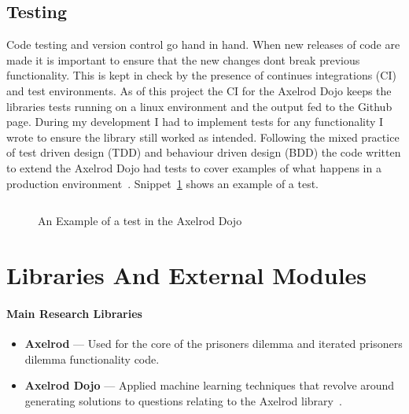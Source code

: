 \subsection{Testing}\label{ssec:testing}
Code testing and version control go hand in hand. 
When new releases of code are made it is important to ensure that the new changes dont break previous functionality.
This is kept in check by the presence of continues integrations (CI) and test environments.
As of this project the CI for the Axelrod Dojo keeps the libraries tests running on a linux environment and the output fed to the Github page.
During my development I had to implement tests for any functionality I wrote to ensure the library still worked as intended.
Following the mixed practice of test driven design (TDD) and behaviour driven design (BDD) the code written to extend the Axelrod Dojo had tests to cover examples of what happens in a production environment~\cite{hong2015top, prlic2012ten, sandve2013ten}.
Snippet~\ref{code:test-example} shows an example of a test.

\begin{figure}[ht]
    \inputminted{python}{code_snippets/dev-examples/example-test.py}
    \caption{An Example of a test in the Axelrod Dojo}\label{code:test-example}
\end{figure}

\section{Libraries And External Modules}
\paragraph{Main Research Libraries}
\begin{itemize}
    \item \textbf{Axelrod} --- Used for the core of the prisoners dilemma and iterated prisoners dilemma functionality code.\cite{axelrodproject}
    \item \textbf{Axelrod Dojo} --- Applied machine learning techniques that revolve around generating solutions to questions relating to the Axelrod library~\cite{dojoV008}.
\end{itemize}

